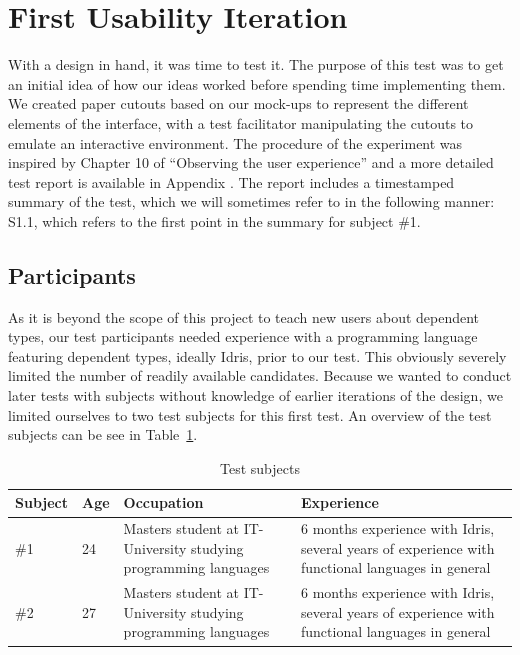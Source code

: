 \section{First Usability Iteration}
\label{sec:UsabilityTest}
With a design in hand, it was time to test it. The purpose of this test was to
get an initial idea of how our ideas worked before spending time implementing
them. We created paper cutouts based on our mock-ups to represent the different
elements of the interface, with a test facilitator manipulating the cutouts to
emulate an interactive environment. The procedure of the experiment was inspired by Chapter 10 of ``Observing the user experience'' and a more detailed test report is available in Appendix . The report includes a timestamped summary of the test, which we
will sometimes refer to in the following manner: S1.1, which refers to the
first point in the summary for subject \#1.

\subsection{Participants}
As it is beyond the scope of this project to teach new users about dependent
types, our test participants needed experience with a programming language
featuring dependent types, ideally Idris, prior to our test. This obviously
severely limited the number of readily available candidates. Because we wanted
to conduct later tests with subjects without knowledge of earlier iterations of
the design, we limited ourselves to two test subjects for this first test. An
overview of the test subjects can be see in Table~\ref{table:first_test_subjects}.

\begin{table}
\centering
\begin{tabular}{| l | l | p{5cm} | p{5cm} |}
\hline
Subject & Age & Occupation & Experience \\ \hline
\#1 & 24 & Masters student at IT-University studying programming languages & 6 months experience with Idris, several years of experience with functional languages in general \\ \hline
\#2 & 27 & Masters student at IT-University studying programming languages & 6 months experience with Idris, several years of experience with functional languages in general \\ \hline
\end{tabular}
\caption{Test subjects}
\label{table:first_test_subjects}
\end{table}

